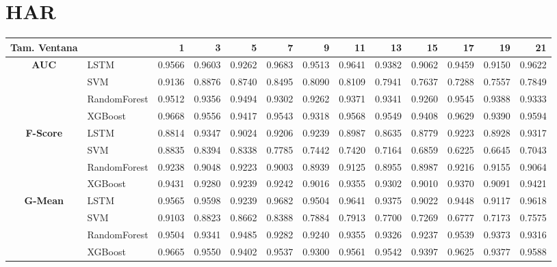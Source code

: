 \section{HAR}
\begin{table}[h]
	\centering
	\begin{adjustbox}{max width=15cm}
		\begin{tabular}{|c|l|r|r|r|r|r|r|r|r|r|r|r|}
			\hline
			\textbf{Tam. Ventana}&         &      1  &      3  &      5  &      7  &      9  &      11 &      13 &      15 &      17 &      19 &      21 \\
			\hline
			\textbf{AUC} & LSTM &  0.9566 &  0.9603 &  0.9262 &  0.9683 &  0.9513 &  0.9641 &  0.9382 &  0.9062 &  0.9459 &  0.9150 &  0.9622 \\
			& SVM &  0.9136 &  0.8876 &  0.8740 &  0.8495 &  0.8090 &  0.8109 &  0.7941 &  0.7637 &  0.7288 &  0.7557 &  0.7849 \\
			& RandomForest &  0.9512 &  0.9356 &  0.9494 &  0.9302 &  0.9262 &  0.9371 &  0.9341 &  0.9260 &  0.9545 &  0.9388 &  0.9333 \\
			& XGBoost &  0.9668 &  0.9556 &  0.9417 &  0.9543 &  0.9318 &  0.9568 &  0.9549 &  0.9408 &  0.9629 &  0.9390 &  0.9594 \\
			\hline
			\textbf{F-Score} & LSTM &  0.8814 &  0.9347 &  0.9024 &  0.9206 &  0.9239 &  0.8987 &  0.8635 &  0.8779 &  0.9223 &  0.8928 &  0.9317 \\
			& SVM &  0.8835 &  0.8394 &  0.8338 &  0.7785 &  0.7442 &  0.7420 &  0.7164 &  0.6859 &  0.6225 &  0.6645 &  0.7043 \\
			& RandomForest &  0.9238 &  0.9048 &  0.9223 &  0.9003 &  0.8939 &  0.9125 &  0.8955 &  0.8987 &  0.9216 &  0.9155 &  0.9064 \\
			& XGBoost &  0.9431 &  0.9280 &  0.9239 &  0.9242 &  0.9016 &  0.9355 &  0.9302 &  0.9010 &  0.9370 &  0.9091 &  0.9421 \\
			\hline
			\textbf{G-Mean} & LSTM &  0.9565 &  0.9598 &  0.9239 &  0.9682 &  0.9504 &  0.9641 &  0.9375 &  0.9022 &  0.9448 &  0.9117 &  0.9618 \\
			& SVM &  0.9103 &  0.8823 &  0.8662 &  0.8388 &  0.7884 &  0.7913 &  0.7700 &  0.7269 &  0.6777 &  0.7173 &  0.7575 \\
			& RandomForest &  0.9504 &  0.9341 &  0.9485 &  0.9282 &  0.9240 &  0.9355 &  0.9326 &  0.9237 &  0.9539 &  0.9373 &  0.9316 \\
			& XGBoost &  0.9665 &  0.9550 &  0.9402 &  0.9537 &  0.9300 &  0.9561 &  0.9542 &  0.9397 &  0.9625 &  0.9377 &  0.9588 \\

\end{tabular}
\end{adjustbox}
\end{table}
